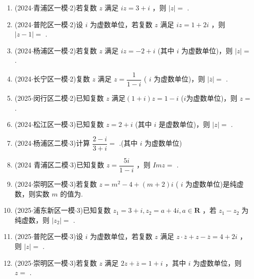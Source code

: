 \begin{enumerate}
    \item (2024$\cdot$青浦区一模$\cdot$2)若复数 $z$ 满足 ${i}z = 3 + {i}$ ，则 $\left| z\right|  =$ .

    \item (2024$\cdot$普陀区一模$\cdot$2)设 ${i}$ 为虚数单位，若复数 $z$ 满足 ${i}z = 1 + 2{i}$ ，则 $\left| {z - 1}\right|  =$ .

    \item (2024$\cdot$杨浦区一模$\cdot$2)若复数 $z$ 满足 ${i}z =  - 2 + {i}$ (其中 ${i}$ 为虚数单位)，则 $\left| z\right|  =$ .

    \item (2024$\cdot$长宁区一模$\cdot$2)复数 $z$ 满足 $z = \dfrac{1}{1 - {i}}$ ( ${i}$ 为虚数单位)，则 $\left| \overline{z}\right|  =$ .

    \item (2025$\cdot$闵行区二模$\cdot$2)已知复数 $z$ 满足$(1+i) z = 1 - {i}$ ($i$为虚数单位)，则 $z =$ .

    \item (2024$\cdot$松江区一模$\cdot$3)已知复数 $z = 2 + {i}$ (其中 ${i}$ 是虚数单位)，则 $\left| z\right|  =$ .

    \item (2024$\cdot$杨浦区二模$\cdot$3)计算 $\dfrac{2 - {i}}{3 + {i}} =$ .(其中 ${i}$ 为虚数单位)

    \item (2024 青浦区二模$\cdot$3)已知复数 $z = \dfrac{5{i}}{1 - {i}}$ ，则 ${Im}z =$ .

    \item (2024$\cdot$崇明区一模$\cdot$3)若复数 $z = {m}^{2} - 4 + \left( {m + 2}\right) {i}$ ( ${i}$ 为虚数单位)是纯虚数，则实数 $m$ 的值为.

    \item (2025$\cdot$浦东新区一模$\cdot$3)已知复数 ${z}_{1} = 3 + {i},{z}_{2} = a + 4{i},a \in  \mathbf{R}$ ，若 ${z}_{1} - {z}_{2}$ 为纯虚数，则 $\left| {z}_{2}\right|  =$ .

    \item (2025$\cdot$普陀区一模$\cdot$3)设 ${i}$ 为虚数单位，若复数 $z$ 满足 $z \cdot  \overline{z} + z - \overline{z} = 4 + 2{i}$ ，则 $\left| z\right|  =$ .

    \item (2025$\cdot$崇明区一模$\cdot$3)若复数 $z$ 满足 ${2z} + \overline{z} = 1 + {i}$ ，其中 ${i}$ 为虚数单位，则 $z =$ .


\end{enumerate}
